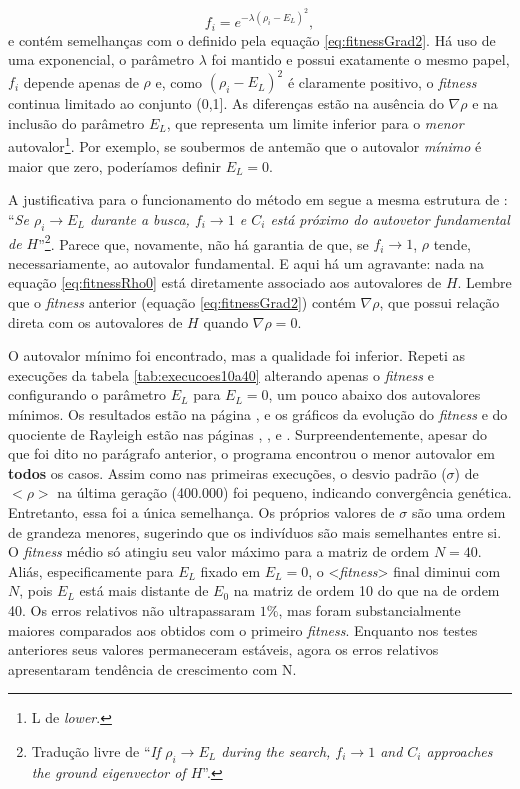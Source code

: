 	\begin{equation}\label{eq:fitnessRho0}
		f_i = e^{-\lambda(\rho_i - E_L)^2},
	\end{equation}
e contém semelhanças com o definido pela equação \ref{eq:fitnessGrad2}. Há uso de uma exponencial, o parâmetro $\lambda$ foi mantido e possui exatamente o mesmo papel, $f_i$ depende apenas de $\rho$ e, como $(\rho_i - E_L)^2$ é claramente positivo, o \textit{fitness} continua limitado ao conjunto (0,1]. As diferenças estão na ausência do $\nabla \rho$ e na inclusão do parâmetro $E_L$, que representa um limite inferior para o \textit{menor} autovalor\footnote{L de \textit{lower}.}. Por exemplo, se soubermos de antemão que o autovalor \textit{mínimo} é maior que zero, poderíamos definir $E_L = 0$. 

	 A justificativa para o funcionamento do método em \cite{metodo2011} segue a mesma estrutura de \cite{metodo2004}: ``\textit{Se $\rho_i \rightarrow E_L$ durante a busca, $f_i \rightarrow 1$ e $C_i$ está próximo do autovetor fundamental de $H$}''\footnote{Tradução livre de ``\textit{If $\rho_i \rightarrow E_L$ during the search, $f_i \rightarrow 1$ and $C_i$ approaches the ground eigenvector of $H$}''.}. Parece que, novamente, não há garantia de que, se $f_i \rightarrow 1$, $\rho$ tende, necessariamente, ao autovalor fundamental. E aqui há um agravante: nada na equação \ref{eq:fitnessRho0} está diretamente associado aos autovalores de $H$. Lembre que o \textit{fitness} anterior (equação \ref{eq:fitnessGrad2}) contém $\nabla \rho$, que possui relação direta com os autovalores de $H$ quando $\nabla \rho = 0$.
	
	O autovalor mínimo foi encontrado, mas a qualidade foi inferior. Repeti as execuções da tabela \ref{tab:execucoes10a40} alterando apenas o \textit{fitness} e configurando o parâmetro $E_L$ para $E_L = 0$, um pouco abaixo dos autovalores mínimos. Os resultados estão na página \pageref{tab:execucoesNovoFitness}, e os gráficos da evolução do \textit{fitness} e do quociente de Rayleigh estão nas páginas \pageref{fig:execucoes_N10_EL}, \pageref{fig:execucoes_N20_EL}, \pageref{fig:execucoes_N30_EL} e \pageref{fig:execucoes_N40_EL}. Surpreendentemente, apesar do que foi dito no parágrafo anterior, o programa encontrou o menor autovalor em \textbf{todos} os casos. Assim como nas primeiras execuções, o desvio padrão ($\sigma$) de $<\rho>$ na última geração (400.000) foi pequeno, indicando convergência genética. Entretanto, essa foi a única semelhança. Os próprios valores de $\sigma$ são uma ordem de grandeza menores, sugerindo que os indivíduos são mais semelhantes entre si. O \textit{fitness} médio só atingiu seu valor máximo para a matriz de ordem $N = 40$. Aliás, especificamente para $E_L$ fixado em $E_L = 0$, o <\textit{fitness}> final diminui com $N$, pois $E_L$ está mais distante de $E_0$ na matriz de ordem 10 do que na de ordem 40. Os erros relativos não ultrapassaram $1\%$, mas foram substancialmente maiores comparados aos obtidos com o primeiro \textit{fitness}. Enquanto nos testes anteriores seus valores permaneceram estáveis, agora os erros relativos apresentaram tendência de crescimento com N.
	
